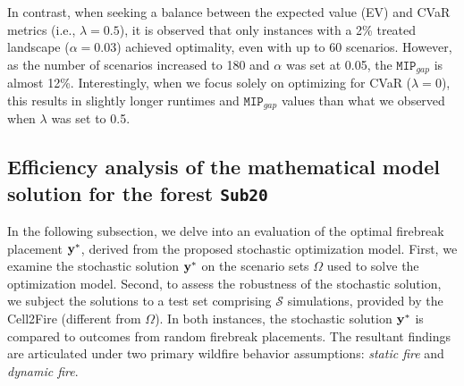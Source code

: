 \documentclass[a4paper,fleqn]{cas-sc}
\begin{document}
In contrast, when seeking a balance between the expected value (EV) and CVaR metrics (i.e., $\lambda = 0.5$), it is observed that only instances with a 2\% treated landscape ($\alpha = 0.03$) achieved optimality, even with up to 60 scenarios. However, as the number of scenarios increased to 180 and $\alpha$ was set at 0.05, the $\texttt{MIP}_{gap}$ is almost 12\%. Interestingly, when we focus solely on optimizing for CVaR ($\lambda = 0$), this results in slightly longer runtimes and $\texttt{MIP}_{gap}$ values than what we observed when $\lambda$ was set to 0.5.

\subsection{Efficiency analysis of the mathematical model solution for the forest \texttt{Sub20}} \label{s:results}


In the following subsection, we delve into an evaluation of the optimal  firebreak placement $\vb{y}^{*}$, derived from the proposed stochastic optimization model. First, we examine the stochastic solution $\vb{y}^{*}$ on the scenario sets $\Omega$ used to solve the optimization model. Second, to assess the robustness of the stochastic solution, we subject the solutions to a test set comprising $\mathcal{S}$ simulations, provided by the Cell2Fire (different from $\Omega$). In both instances, the stochastic solution $\vb{y}^{*}$ is compared to outcomes from random firebreak placements. The resultant findings are articulated under two primary wildfire behavior assumptions: \textit{static fire} and \textit{dynamic fire}.
\end{document}
